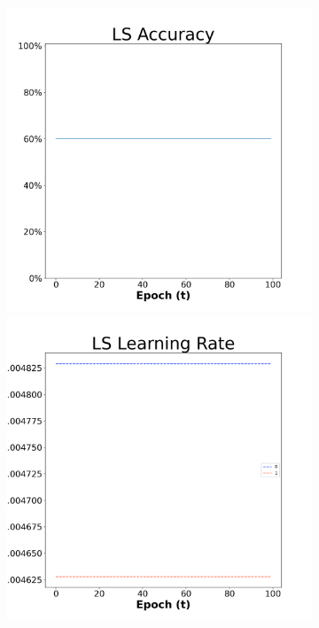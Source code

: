 \begin{figure}[H]
    \centering %
\begin{subfigure}{0.3\textwidth}
  \includegraphics[width=\linewidth]{images/exper1/NSP/LS_0.01_acc.png}
    \includegraphics[width=\linewidth]{images/exper1/NSP/LS_0.01_lr.png}

\end{subfigure}
\end{figure}
